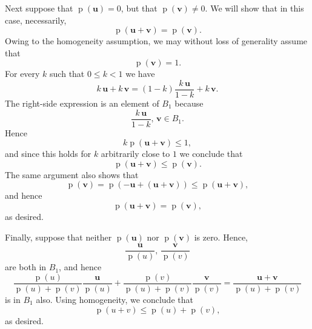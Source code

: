 \documentclass[12pt]{article}
\newcommand{\bu}{\mathbf{u}}
\newcommand{\bv}{\mathbf{v}}
\newcommand{\pnorm}{\operatorname{p}}
\newcommand{\snorm}[1]{\pnorm(#1)}
\begin{document}
Next suppose that $\snorm{\bu}=0$, but that $\snorm{\bv}\neq 0$. We will show
that in this case, necessarily,
$$\snorm{\bu+\bv} = \snorm{\bv}.$$
Owing to the homogeneity assumption, we may without loss of generality
assume that
$$\snorm{\bv}=1.$$
For every $k$ such that $0\leq k<1$ we have
$$ k\,\bu+k\,\bv = (1-k) \frac{k\,\bu}{1-k} + k\,\bv.$$
The right-side expression is an element of $B_1$ because
$$\frac{k\,\bu}{1-k},\, \bv \in B_1.$$
Hence
$$k\snorm{\bu+\bv} \leq 1,$$
and since this holds for $k$ arbitrarily close to $1$ we conclude that
$$\snorm{\bu+\bv}\leq \snorm{\bv}.$$
The same argument also shows that
$$\snorm{\bv} = \snorm{-\bu+(\bu+\bv)} \leq \snorm{\bu+\bv},$$
and hence
$$\snorm{\bu+\bv}=\snorm{\bv},$$
as desired.

Finally, suppose that neither $\snorm{\bu}$ nor $\snorm{\bv}$ is zero. Hence,
$$\frac{\bu}{\snorm{u}},\, \frac{\bv}{\snorm{v}}$$
are both in $B_1$, and hence
$$\frac{\snorm{u}}{\snorm{u}+\snorm{v}} \frac{\bu}{\snorm{u}}+
\frac{\snorm{v}}{\snorm{u}+\snorm{v}} \frac{\bv}{\snorm{v}} =
\frac{\bu+\bv}{\snorm{u}+\snorm{v}} 
$$
is in $B_1$ also. Using homogeneity, we conclude that
$$\snorm{u+v}\leq \snorm{u}+\snorm{v},$$
as desired.
\end{document}
